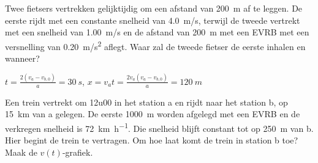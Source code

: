 \documentclass{ximera}
\begin{document}
\begin{exercise}
    Twee fietsers vertrekken gelijktijdig om een afstand van \SI{200}{m} af te leggen. De eerste rijdt met een constante snelheid van \SI{4,0}{m/s}, terwijl de tweede vertrekt met een snelheid van \SI{1,00}{m/s} en de afstand van \SI{200}{m} met een EVRB met een versnelling van \SI{0,20}{m/s^2} aflegt. Waar zal de tweede fietser de eerste inhalen en wanneer?
    \begin{oplossing}
        $t=\frac{2(v_a-v_{b,0})}{a}=\SI{30}{s}$,
        $x=v_at=\frac{2v_a(v_a-v_{b,0})}{a}=\SI{120}{m}$
    \end{oplossing}
\end{exercise}

\begin{exercise}
        Een trein vertrekt om 12u00 in het station a en rijdt naar het station b, op \SI{15}{\kilo\meter} van a gelegen. 
        De eerste \SI{1000}{m} worden afgelegd met een EVRB en de verkregen snelheid is \SI{72}{\kilo\meter\per\hour}. 
        Die snelheid blijft constant tot op \SI{250}{\meter} van b. Hier begint de trein te vertragen. Om hoe laat komt de trein in station b toe? Maak de $v(t)$-grafiek.
\end{exercise}
\end{document}
